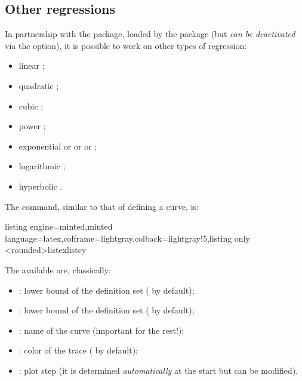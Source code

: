 \documentclass[11pt,a4paper]{ltxdoc}
\begin{document}
\subsection{Other regressions}\label{regressions}

In partnership with the  package, loaded by the package (but \textit{can be deactivated} via the \MontreCode{[noxintreg]} option), it is possible to work on other types of regression:

\begin{itemize}
	\item linear ;
	\item quadratic ;
	\item cubic ;
	\item power ;
	\item exponential  or  or  or ;
	\item logarithmic ;
	\item hyperbolic  .
\end{itemize}

The command, similar to that of defining a curve, is:

\begin{tcblisting}{listing engine=minted,minted language=latex,colframe=lightgray,colback=lightgray!5,listing only}
<rounded>{listex}{listey}
\end{tcblisting}

The \MontreCode{[keys]} available are, classically:

\begin{itemize}
	\item {}: lower bound of the definition set ( by default);
	\item {}: lower bound of the definition set ( by default);
	\item {}: name of the curve (important for the rest!);
	\item {}: color of the trace ( by default);
	\item {}: plot step (it is determined \textit{automatically} at the start but can be modified).
\end{itemize}
\end{document}
